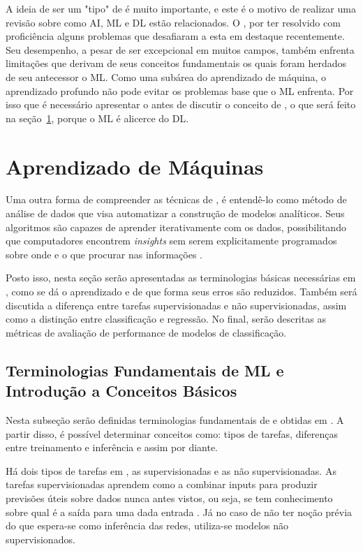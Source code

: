         A ideia de \ap\textit{ }ser um "tipo"\textit{ }de \am\textit{ }é muito importante, e este é o motivo de realizar uma revisão sobre como AI, ML e DL estão relacionados. O \ap, por ter resolvido com proficiência alguns problemas que desafiaram a \ia\textit{ }esta em destaque recentemente. Seu desempenho, a pesar de ser excepcional em muitos campos, também enfrenta limitações que derivam de seus conceitos fundamentais os quais foram herdados de seu antecessor o ML. Como uma subárea do aprendizado de máquina, o aprendizado profundo não pode evitar os problemas base que o ML enfrenta. Por isso que é necessário apresentar o \am\textit{ }antes de discutir o conceito de \ap, o que será feito na seção~\ref{cap:ML}, porque o ML é alicerce do DL. 
        
    \section{Aprendizado de Máquinas}\label{cap:ML}
        
        Uma outra forma de compreender as técnicas de \am, é entendê-lo como método de análise de dados que visa automatizar a construção de modelos analíticos. Seus algoritmos são capazes de aprender iterativamente com os dados, possibilitando que computadores encontrem \textit{insights} sem serem explicitamente programados sobre onde e o que procurar nas informações \cite{CollegeL30:online}.
        
        Posto isso, nesta seção serão apresentadas as terminologias básicas necessárias em \am, como se dá o aprendizado e de que forma seus erros são reduzidos. Também será discutida a diferença entre tarefas supervisionadas e não supervisionadas, assim como a distinção entre classificação e regressão. No final, serão descritas as métricas de avaliação de performance de modelos de classificação.
        
        \subsection{Terminologias Fundamentais de ML e Introdução a Conceitos Básicos}
        
            Nesta subseção serão definidas terminologias fundamentais de \am e \ap obtidas em \cite{MachineL6:online}. A partir disso, é possível determinar conceitos como: tipos de tarefas, diferenças entre treinamento e inferência e assim por diante.
    
            Há dois tipos de tarefas em \am, as supervisionadas e as não supervisionadas. As tarefas supervisionadas aprendem como a combinar inputs para produzir previsões úteis sobre dados nunca antes vistos, ou seja, se tem conhecimento sobre qual é a saída para uma dada entrada \cite{singh2016review}. Já no caso de não ter noção prévia do que espera-se como inferência das redes, utiliza-se modelos não supervisionados.
        
